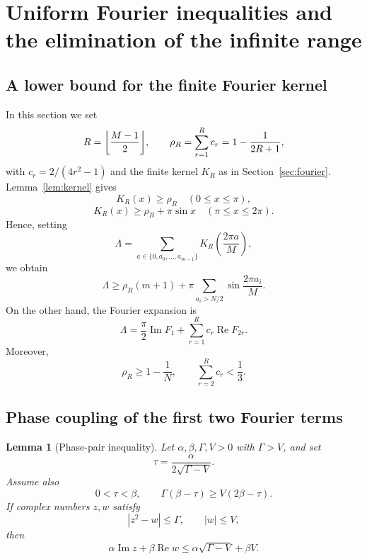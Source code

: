 \documentclass[11pt]{article}
\newtheorem{lemma}[theorem]{Lemma}
\theoremstyle{definition}
\theoremstyle{remark}
\numberwithin{equation}{section}
\DeclarePairedDelimiter{\floor}{\lfloor}{\rfloor}
\begin{document}
\section{Uniform Fourier inequalities and the elimination of the infinite range}\label{sec:uniform-fourier}

\subsection{A lower bound for the finite Fourier kernel}

In this section we set
\[
  R=\floor*{\frac{M-1}{2}},
  \qquad
  \rho_R=\sum_{r=1}^{R}c_r=1-\frac1{2R+1},
\]
with $c_r=2/(4r^2-1)$ and the finite kernel $K_R$ as in
Section~\ref{sec:fourier}. Lemma~\ref{lem:kernel} gives
\[
  K_R(x)\ge \rho_R\quad(0\le x\le\pi),
\]
\[
  K_R(x)\ge \rho_R+\pi\sin x\quad(\pi\le x\le2\pi).
\]
Hence, setting
\[
  \Lambda=
  \sum_{a\in\{0,a_0,\ldots,a_{m-1}\}}
  K_R\!\left(\frac{2\pi a}{M}\right),
\]
we obtain
\begin{equation}\label{eq:Lambda-lower-general}
  \Lambda\ge \rho_R(m+1)+
  \pi\sum_{a_i>N/2}\sin\frac{2\pi a_i}{M}.
\end{equation}
On the other hand, the Fourier expansion is
\begin{equation}\label{eq:Lambda-fourier}
  \Lambda=\frac\pi2\operatorname{Im}F_1+
  \sum_{r=1}^{R}c_r\operatorname{Re}F_{2r}.
\end{equation}
Moreover,
\begin{equation}\label{eq:coeff-tail-third}
  \rho_R\ge1-\frac1N,
  \qquad
  \sum_{r=2}^{R}c_r<\frac13.
\end{equation}

\subsection{Phase coupling of the first two Fourier terms}

\begin{lemma}[Phase-pair inequality]\label{lem:phase-pair}
Let $\alpha,\beta,\Gamma,V>0$ with $\Gamma>V$, and set
\[
  \tau=\frac{\alpha}{2\sqrt{\Gamma-V}}.
\]
Assume also
\[
  0<\tau<\beta,
  \qquad
  \Gamma(\beta-\tau)\ge V(2\beta-\tau).
\]
If complex numbers $z,w$ satisfy
\[
  |z^2-w|\le \Gamma,
  \qquad
  |w|\le V,
\]
then
\begin{equation}\label{eq:phase-pair}
  \alpha\operatorname{Im}z+
  \beta\operatorname{Re}w
  \le
  \alpha\sqrt{\Gamma-V}+\beta V.
\end{equation}
\end{lemma}
\end{document}
